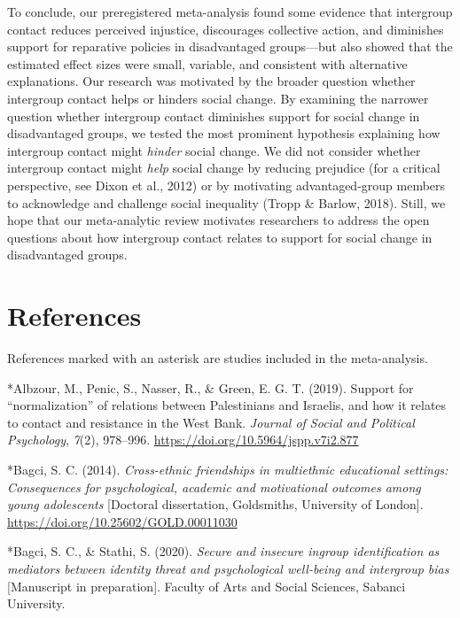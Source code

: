 \documentclass[12pt, letterpaper]{article}
\begin{document}
To conclude, our preregistered meta-analysis found some evidence that
intergroup contact reduces perceived injustice, discourages collective
action, and diminishes support for reparative policies in disadvantaged
groups---but also showed that the estimated effect sizes were small,
variable, and consistent with alternative explanations. Our research was
motivated by the broader question whether intergroup contact helps or
hinders social change. By examining the narrower question whether
intergroup contact diminishes support for social change in disadvantaged
groups, we tested the most prominent hypothesis explaining how
intergroup contact might \emph{hinder} social change. We did not
consider whether intergroup contact might \emph{help} social change by
reducing prejudice (for a critical perspective, see Dixon et al., 2012)
or by motivating advantaged-group members to acknowledge and challenge
social inequality (Tropp \& Barlow, 2018). Still, we hope that our
meta-analytic review motivates researchers to address the open questions
about how intergroup contact relates to support for social change in
disadvantaged groups.

\hypertarget{references}{%
\section{References}\label{references}}

\noindent References marked with an asterisk are studies included in the
meta-analysis.

\begingroup

\noindent \setlength{\parindent}{-0.5in} \setlength{\leftskip}{0.5in}
\small

\hypertarget{refs}{}
\leavevmode\hypertarget{ref-3201}{}%
*Albzour, M., Penic, S., Nasser, R., \& Green, E. G. T. (2019). Support
for ``normalization'' of relations between Palestinians and Israelis,
and how it relates to contact and resistance in the West Bank.
\emph{Journal of Social and Political Psychology}, \emph{7}(2),
978--996. \url{https://doi.org/10.5964/jspp.v7i2.877}

\leavevmode\hypertarget{ref-2023}{}%
*Bagci, S. C. (2014). \emph{Cross-ethnic friendships in multiethnic
educational settings: Consequences for psychological, academic and
motivational outcomes among young adolescents} {[}Doctoral dissertation,
Goldsmiths, University of London{]}.
\url{https://doi.org/10.25602/GOLD.00011030}

\leavevmode\hypertarget{ref-2395}{}%
*Bagci, S. C., \& Stathi, S. (2020). \emph{Secure and insecure ingroup
identification as mediators between identity threat and psychological
well-being and intergroup bias} {[}Manuscript in preparation{]}. Faculty
of Arts and Social Sciences, Sabanci University.
\end{document}

